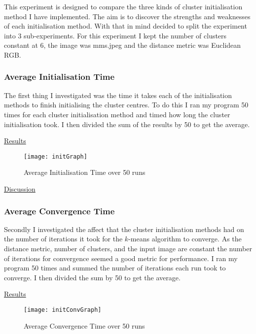 \documentclass{article}
\begin{document}
This experiment is designed to compare the three kinds of cluster initialisation method I have implemented. The aim is to discover the strengths and weaknesses of each initialisation method. With that in mind decided to split the experiment into 3 sub-experiments. For this experiment I kept the number of clusters constant at 6, the image was mms.jpeg and the distance metric was Euclidean RGB.

\subsubsection{Average Initialisation Time}

The first thing I investigated was the time it takes each of the initialisation methods to finish initialising the cluster centres. To do this I ran my program 50 times for each cluster initialisation method and timed how long the cluster initialisation took. I then divided the sum of the results by 50 to get the average.

\underline{Results}


\begin{figure}[H]
\begin{center}
\texttt{[image: initGraph]}
\caption{Average Initialisation Time over 50 runs}
\end{center}
\end{figure}



\underline{Discussion}


\subsubsection{Average Convergence Time}

Secondly I investigated the affect that the cluster initialisation methods had on the number of iterations it took for the $k$-means algorithm to converge. As the distance metric, number of clusters, and the input image are constant the number of iterations for convergence seemed a good metric for performance. I ran my program 50 times and summed the number of iterations each run took to converge. I then divided the sum by 50 to get the average.


\underline{Results}

\begin{figure}[H]
\begin{center}
\texttt{[image: initConvGraph]}
\caption{Average Convergence Time over 50 runs}
\end{center}
\end{figure}
\end{document}
